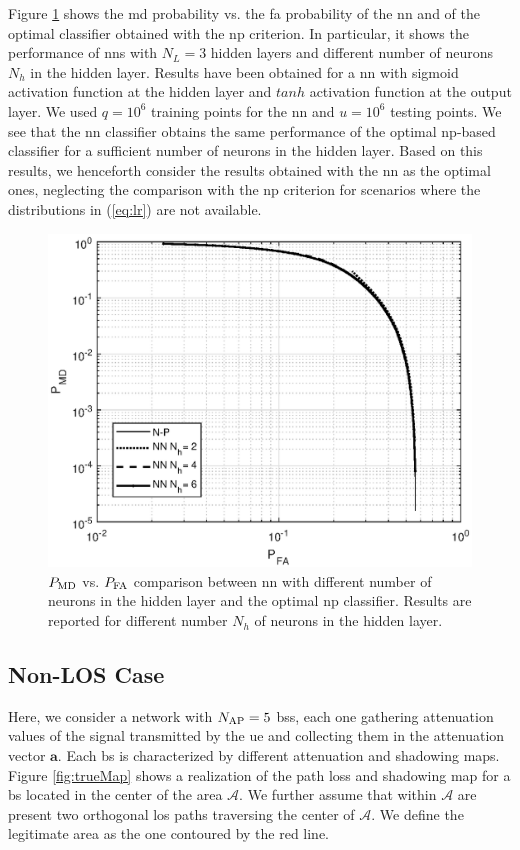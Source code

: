 \documentclass[conference]{IEEEtran}
\begin{document}
Figure \ref{fig:NP_comp} shows the \ac{md} probability vs. the \ac{fa} probability of the \ac{nn} and of the optimal classifier obtained with the  \ac{np} criterion. In particular, it shows the performance of \acp{nn} with $N_L=3$ hidden layers and different number of neurons $N_h$ in the hidden layer. Results have been obtained for a \ac{nn} with sigmoid activation function at the hidden layer and $tanh$ activation function at the output layer. We used $q=10^6$ training points for the \ac{nn} and $u=10^6$ testing points. We see that the \ac{nn} classifier obtains the same performance of the optimal \ac{np}-based classifier for a sufficient number of neurons in the hidden layer. Based on this results, we henceforth consider the results obtained with the \ac{nn} as the optimal ones, neglecting the comparison with the \ac{np} criterion for scenarios where the distributions in (\ref{eq:lr}) are not available.

 \begin{figure}[h]
     \centering
     \includegraphics[width=0.9\columnwidth]{FA_MD_LOS.eps}
     \caption{$P_{\rm MD}$ vs. $P_{\rm FA}$ comparison between \ac{nn} with different number of neurons in the hidden layer and the optimal \ac{np} classifier. Results are reported for different number $N_h$ of neurons in the hidden layer.}
     \label{fig:NP_comp}
 \end{figure}


\subsection{Non-LOS Case}
Here, we consider a network with $N_{\rm AP}=5$ \acp{bs}, each one gathering attenuation values of the signal transmitted by the \ac{ue} and collecting them in the attenuation vector $\bm{a}$. Each \ac{bs} is characterized by different attenuation and shadowing maps. Figure \ref{fig:trueMap} shows a realization of the path loss and shadowing map for a \ac{bs} located in the center of the area $\mathcal{A}$. We further assume that within $\mathcal{A}$ are present two orthogonal \ac{los} paths traversing the center of $\mathcal{A}$. We define the legitimate area as the one contoured by the red line.
\end{document}
